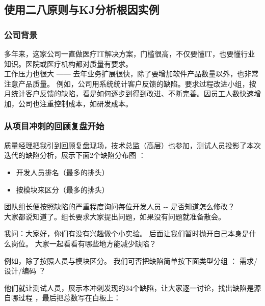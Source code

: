 \hypertarget{ux4f7fux7528ux4e8cux516bux539fux5219ux4e0ekjux5206ux6790ux6839ux56e0ux5b9eux4f8b}{%
\subsection{使用二八原则与KJ分析根因实例}\label{ux4f7fux7528ux4e8cux516bux539fux5219ux4e0ekjux5206ux6790ux6839ux56e0ux5b9eux4f8b}}

\hypertarget{ux516cux53f8ux80ccux666f}{%
\subsubsection{公司背景}\label{ux516cux53f8ux80ccux666f}}

多年来，这家公司一直做医疗IT解决方案，门槛很高，不仅要懂IT，也要懂行业知识。医院或医疗机构都对质量有要求。\\
工作压力也很大 ------
去年业务扩展很快，除了要增加软件产品数量以外，也非常注意产品质量。
例如，公司用系统统计客户反馈的缺陷。要求过程改进小组，按月统计客户反馈的缺陷，看是如何逐步到得到改进、不断完善。因员工人数快速增加，公司也注重控制成本，如研发成本。

\hypertarget{ux4eceux9879ux76eeux51b2ux523aux7684ux56deux987eux590dux76d8ux5f00ux59cb}{%
\subsubsection{从项目冲刺的回顾复盘开始}\label{ux4eceux9879ux76eeux51b2ux523aux7684ux56deux987eux590dux76d8ux5f00ux59cb}}

质量经理把我引到回顾复盘现场，技术总监（高层）也参加，测试人员投影了本次迭代的缺陷分析，展示下面2个缺陷分布图
：

\begin{itemize}
\tightlist
\item
  开发人员排名（最多的排头）
\item
  按模块来区分（最多的排头）
\end{itemize}

团队组长便按照缺陷的严重程度询问每位开发人员 -\/- 是否知道怎么修改？\\
大家都说知道了。组长要求大家提出问题，如果没有问题就准备散会。

我问：大家好，你们有没有兴趣做个小实验。
后面让我们暂时抛开自己本身是什么岗位。
大家一起看看有哪些地方能减少缺陷？

例如，除了按照人员与模块区分。 我们可否把缺陷简单按下面类型分组 ：
需求/设计/编码 ？

他们就让测试人员，展示本冲刺发现的34个缺陷，让大家逐一讨论，找出缺陷是源自哪过程
，最后把总数写在白板上：

